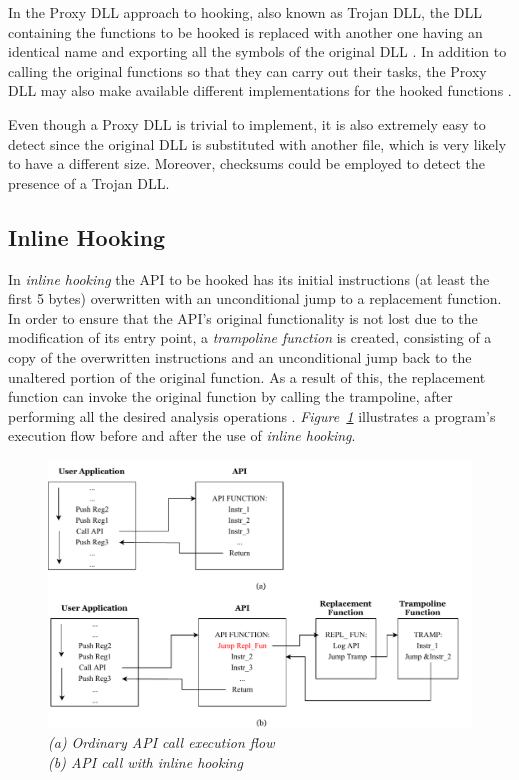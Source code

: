In the Proxy DLL approach to hooking, also known as Trojan DLL, the DLL containing the functions to be hooked is replaced with another one having an identical name and exporting all the symbols of the original DLL \cite{CodeProjectHooking}. In addition to calling the original functions so that they can carry out their tasks, the Proxy DLL may also make available different implementations for the hooked functions \cite{Berdajs:2010:EAU:1815744.1815746}.

Even though a Proxy DLL is trivial to implement, it is also extremely easy to detect since the original DLL is substituted with another file, which is very likely to have a different size. Moreover, checksums could be employed to detect the presence of a Trojan DLL.


\subsection{Inline Hooking}

In \textit{inline hooking} the API to be hooked has its initial instructions (at least the first 5 bytes) overwritten with an unconditional jump to a replacement function. In order to ensure that the API's original functionality is not lost due to the modification of its entry point, a \textit{trampoline function} is created, consisting of a copy of the overwritten instructions and an unconditional jump back to the unaltered portion of the original function. As a result of this, the replacement function can invoke the original function by calling the trampoline, after performing all the desired analysis operations \cite{Berdajs:2010:EAU:1815744.1815746}.
\textit{Figure~\ref{Inlined}} illustrates a program's execution flow before and after the use of \textit{inline hooking}.

\begin{figure}[h]
\centering
\includegraphics[scale=0.8]{Figures/Inline.pdf}
\caption{\textit{(a) Ordinary API call execution flow \\
				  (b) API call with inline hooking}}
\label{Inlined}
\end{figure}

